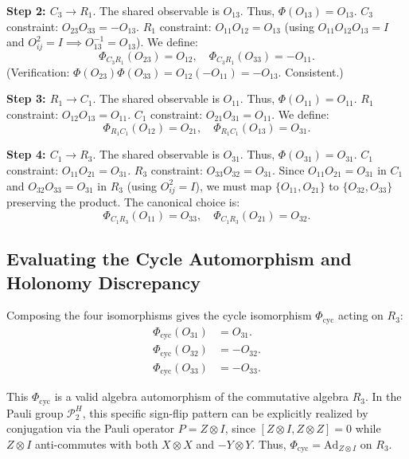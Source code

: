 \documentclass[11pt]{article}
\begin{document}
\textbf{Step 2: $C_3 \to R_1$}.
The shared observable is $O_{13}$. Thus, $\Phi(O_{13}) = O_{13}$.
$C_3$ constraint: $O_{23}O_{33} = -O_{13}$.
$R_1$ constraint: $O_{11}O_{12} = O_{13}$ (using $O_{11}O_{12}O_{13} = I$ and $O_{ij}^2 = I \implies O_{13}^{-1} = O_{13}$).
We define:
\[
  \Phi_{C_3 R_1}(O_{23}) = O_{12}, \quad \Phi_{C_3 R_1}(O_{33}) = -O_{11}.
\]
(Verification: $\Phi(O_{23})\Phi(O_{33}) = O_{12}(-O_{11}) = -O_{13}$. Consistent.)

\textbf{Step 3: $R_1 \to C_1$}.
The shared observable is $O_{11}$. Thus, $\Phi(O_{11}) = O_{11}$.
$R_1$ constraint: $O_{12}O_{13} = O_{11}$.
$C_1$ constraint: $O_{21}O_{31} = O_{11}$.
We define:
\[
  \Phi_{R_1 C_1}(O_{12}) = O_{21}, \quad \Phi_{R_1 C_1}(O_{13}) = O_{31}.
\]

\textbf{Step 4: $C_1 \to R_3$}.
The shared observable is $O_{31}$. Thus, $\Phi(O_{31}) = O_{31}$.
$C_1$ constraint: $O_{11}O_{21} = O_{31}$.
$R_3$ constraint: $O_{33}O_{32} = O_{31}$.
Since $O_{11}O_{21} = O_{31}$ in $C_1$ and $O_{32}O_{33} = O_{31}$ in $R_3$
(using $O_{ij}^2 = I$), we must map $\{O_{11}, O_{21}\}$ to $\{O_{32}, O_{33}\}$
preserving the product. The canonical choice is:
\[
  \Phi_{C_1 R_3}(O_{11}) = O_{33}, \quad \Phi_{C_1 R_3}(O_{21}) = O_{32}.
\]

\subsection{Evaluating the Cycle Automorphism and Holonomy Discrepancy}

Composing the four isomorphisms gives the cycle isomorphism $\Phi_{\mathrm{cyc}}$ acting on $R_3$:
\begin{align*}
\Phi_{\mathrm{cyc}}(O_{31}) &= O_{31}. \\
\Phi_{\mathrm{cyc}}(O_{32}) &= -O_{32}. \\
\Phi_{\mathrm{cyc}}(O_{33}) &= -O_{33}.
\end{align*}

This $\Phi_{\mathrm{cyc}}$ is a valid algebra automorphism of the commutative algebra $R_3$.
In the Pauli group $\mathcal{P}_2^H$, this specific sign-flip pattern can be explicitly
realized by conjugation via the Pauli operator $P = Z \otimes I$, since
$[Z \otimes I, Z \otimes Z] = 0$ while $Z \otimes I$ anti-commutes with both
$X \otimes X$ and $-Y \otimes Y$. Thus, $\Phi_{\mathrm{cyc}} = \mathrm{Ad}_{Z \otimes I}$ on $R_3$.
\end{document}
